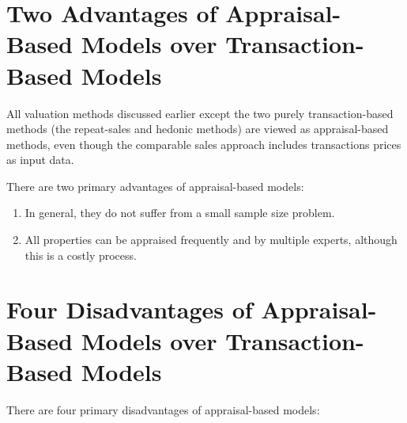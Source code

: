 \documentclass[11pt]{article}
\begin{document}
\section*{Two Advantages of Appraisal-Based Models over Transaction-Based Models}
All valuation methods discussed earlier except the two purely transaction-based methods (the repeat-sales and hedonic methods) are viewed as appraisal-based methods, even though the comparable sales approach includes transactions prices as input data.

There are two primary advantages of appraisal-based models:

\begin{enumerate}
  \item In general, they do not suffer from a small sample size problem.

  \item All properties can be appraised frequently and by multiple experts, although this is a costly process.

\end{enumerate}

\section*{Four Disadvantages of Appraisal-Based Models over Transaction-Based Models}
There are four primary disadvantages of appraisal-based models:
\end{document}
